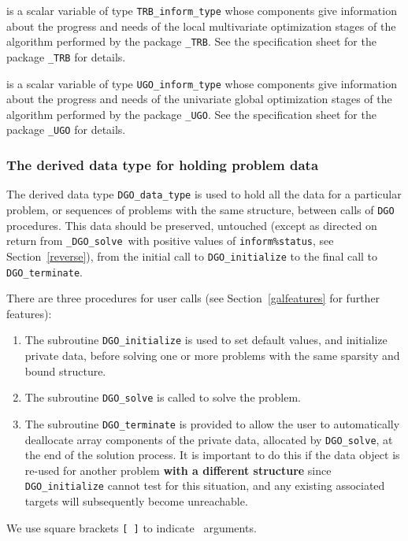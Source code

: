 \documentclass{galahad}
\newcommand{\packagename}{DGO}
\newcommand{\fullpackagename}{\libraryname\_\packagename}
\newcommand{\solver}{{\tt \fullpackagename\_solve}}
\begin{document}
\begin{description}
 is a scalar variable of type
{\tt TRB\_inform\_type}
whose components give information about the progress and needs of the local
multivariate optimization stages of the algorithm performed by the package
{\tt \libraryname\_TRB}.
See the specification sheet for the package
{\tt \libraryname\_TRB}
for details.

 is a scalar variable of type
{\tt UGO\_inform\_type}
whose components give information about the progress and needs of the 
univariate global optimization stages of the algorithm performed by the package
{\tt \libraryname\_UGO}.
See the specification sheet for the package
{\tt \libraryname\_UGO}
for details.

\end{description}


\subsubsection{The derived data type for holding problem data}\label{typedata}
The derived data type
{\tt \packagename\_data\_type}
is used to hold all the data for a particular problem,
or sequences of problems with the same structure, between calls of
{\tt \packagename} procedures.
This data should be preserved, untouched (except as directed on
return from \solver\ with positive values of {\tt inform\%status}, see
Section~\ref{reverse}),
from the initial call to
{\tt \packagename\_initialize}
to the final call to
{\tt \packagename\_terminate}.





\galarguments
There are three procedures for user calls
(see Section~\ref{galfeatures} for further features):

\begin{enumerate}
\item The subroutine
      {\tt \packagename\_initialize}
      is used to set default values, and initialize private data,
      before solving one or more problems with the
      same sparsity and bound structure.
\item The subroutine
      {\tt \packagename\_solve}
      is called to solve the problem.
\item The subroutine
      {\tt \packagename\_terminate}
      is provided to allow the user to automatically deallocate array
       components of the private data, allocated by
       {\tt \packagename\_solve},
       at the end of the solution process.
       It is important to do this if the data object is re-used for another
       problem {\bf with a different structure}
       since {\tt \packagename\_initialize} cannot test for this situation,
       and any existing associated targets will subsequently become unreachable.
\end{enumerate}
We use square brackets {\tt [ ]} to indicate \optional\ arguments.
\end{document}
